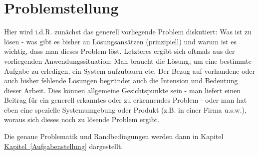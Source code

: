 \chapter{Problemstellung}

Hier wird i.d.R. zunächst das generell vorliegende Problem diskutiert: Was ist zu lösen - was gibt es bisher an Lösungsansätzen (prinzipiell) und warum ist es wichtig, dass man dieses Problem löst. Letzteres ergibt sich oftmals aus der vorliegenden Anwendungssituation: Man braucht die Lösung, um eine bestimmte Aufgabe zu erledigen, ein System aufzubauen etc. Der Bezug auf vorhandene oder auch bisher fehlende Lösungen begründet auch die Intension und Bedeutung dieser Arbeit. Dies können allgemeine Gesichtspunkte sein - man liefert einen Beitrag für ein generell erkanntes oder zu erkennendes Problem - oder man hat eben eine spezielle Systemumgebung oder Produkt (z.B. in einer Firma u.s.w.), woraus sich dieses noch zu lösende Problem ergibt.

Die genaue Problematik und Randbedingungen werden dann in Kapitel \hyperref[Aufgabenstellung]{Kapitel~\ref{Aufgabenstellung}}
dargestellt.
